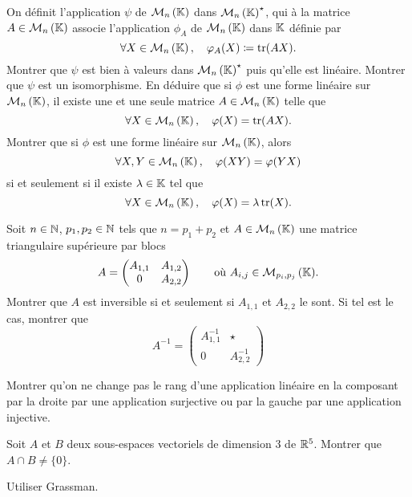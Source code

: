 \documentclass{magnolia}
\begin{document}
\begin{questions}
\question On définit l'application $\psi$ de $\mathcal{M}_{n}\left(\mathbb{K}\right)$ dans $\mathcal{M}_{n}\left(\mathbb{K}\right)^\star$,
  qui à la matrice $A\in\mathcal{M}_{n}\left(\mathbb{K}\right)$ associe l'application $\phi_A$ de
  $\mathcal{M}_{n}\left(\mathbb{K}\right)$ dans $\mathbb{K}$ définie par
  \[\forall X\in\mathcal{M}_{n}\left(\mathbb{K}\right) ,\quad \varphi_A(X)\coloneqq\operatorname{tr}(AX).\]
  Montrer que $\psi$ est bien à valeurs dans $\mathcal{M}_{n}\left(\mathbb{K}\right)^\star$ puis qu'elle est
  linéaire.
\question Montrer que $\psi$ est un isomorphisme. En déduire que si $\phi$ est
  une forme linéaire sur $\mathcal{M}_{n}\left(\mathbb{K}\right)$, il existe une et une seule matrice
  $A\in\mathcal{M}_{n}\left(\mathbb{K}\right)$ telle que
  \[\forall X\in\mathcal{M}_{n}\left(\mathbb{K}\right) ,\quad \varphi(X)=\operatorname{tr}(AX).\] 
\question Montrer que si $\phi$ est une forme linéaire sur $\mathcal{M}_{n}\left(\mathbb{K}\right)$, alors
\[\forall X,Y\in\mathcal{M}_{n}\left(\mathbb{K}\right) ,\quad \varphi(XY)=\varphi(YX)\]
si et seulement si il existe $\lambda\in\mathbb{K}$ tel que
\[\forall X\in\mathcal{M}_{n}\left(\mathbb{K}\right),\quad \varphi(X)=\lambda \operatorname{tr}(X).\]
\end{questions}

Soit $n\in\mathbb{N}$, $p_1,p_2\in\mathbb{N}$ tels que $n=p_1+p_2$ et $A\in\mathcal{M}_{n}\left(\mathbb{K}\right)$ une matrice
triangulaire supérieure par blocs
\[A=
  \begin{pmatrix}
  A_{1,1} & A_{1,2}\\
  0 & A_{2,2}
\end{pmatrix} \qquad \text{où $A_{i,j}\in\mathcal{M}_{p_i,p_j}\left(\mathbb{K}\right)$.}\]
Montrer que $A$ est inversible si et seulement si $A_{1,1}$ et $A_{2,2}$ le
sont. Si tel est le cas, montrer que
\[A^{-1}=
  \begin{pmatrix}
  A_{1,1}^{-1} & \star \\
  0 & A_{2,2}^{-1}
\end{pmatrix}\]




Montrer qu'on ne change pas le rang d'une application linéaire en la composant par
la droite par une application surjective ou par la gauche par une application injective. 


Soit $A$ et $B$ deux sous-espaces vectoriels de dimension $3$ de $\mathbb{R}^5$.
Montrer que $A\cap B\not=\{0\}$.
\begin{sol}
Utiliser Grassman.
\end{sol}
\end{document}
